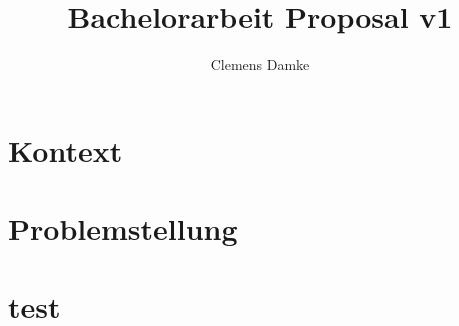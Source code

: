 \documentclass[12pt]{article}
\begin{document}
\title{Bachelorarbeit Proposal v1}
\author{Clemens Damke}

\maketitle

\section{Kontext}

\section{Problemstellung}

\section{test}
\end{document}
